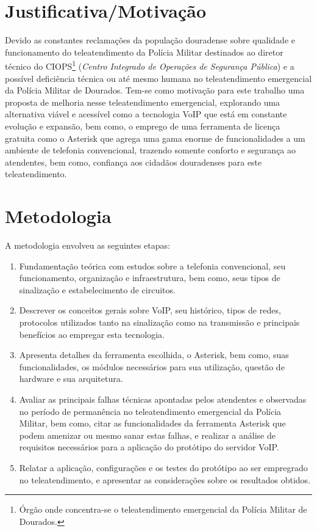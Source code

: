 \section{Justificativa/Motivação}
Devido as constantes reclamações da população douradense sobre qualidade e funcionamento do teleatendimento da Polícia Militar destinados ao diretor técnico do CIOPS\footnote{Órgão onde concentra-se o teleatendimento emergencial da Polícia Militar de Dourados.} (\textit{Centro Integrado de Operações de Segurança Pública}) e a possível deficiência técnica ou até mesmo humana no teleatendimento emergencial da Polícia Militar de Dourados. Tem-se como motivação para este trabalho uma proposta de melhoria nesse teleatendimento emergencial, explorando uma alternativa viável e acessível como a tecnologia VoIP que está em constante evolução e expansão, bem como, o emprego de uma ferramenta de licença gratuita como o Asterisk que agrega uma gama enorme de funcionalidades a um ambiente de telefonia convencional, trazendo somente conforto e segurança ao atendentes, bem como, confiança aos cidadãos douradenses para este teleatendimento.

\section{Metodologia}
A metodologia envolveu as seguintes etapas:
\begin{enumerate}
  \item Fundamentação teórica com estudos sobre a telefonia convencional, seu funcionamento, organização e infraestrutura, bem como, seus tipos de sinalização e estabelecimento de circuitos.
  \item Descrever os conceitos gerais sobre VoIP, seu histórico, tipos de redes, protocolos utilizados tanto na sinalização como na transmissão e principais benefícios ao empregar esta tecnologia.
  \item Apresenta detalhes da ferramenta escolhida, o Asterisk, bem como, suas funcionalidades, os módulos necessários para sua utilização, questão de hardware e sua arquitetura.
  \item Avaliar as principais falhas técnicas apontadas pelos atendentes e observadas no período de permanência no teleatendimento emergencial da Polícia Militar, bem como, citar as funcionalidades da ferramenta Asterisk que podem amenizar ou mesmo sanar estas falhas, e realizar a análise de requisitos necessários para a aplicação do protótipo do servidor VoIP.
  \item Relatar a aplicação, configurações e os testes do protótipo ao ser empregrado no teleatendimento, e apresentar as considerações sobre os resultados obtidos.
\end{enumerate}

